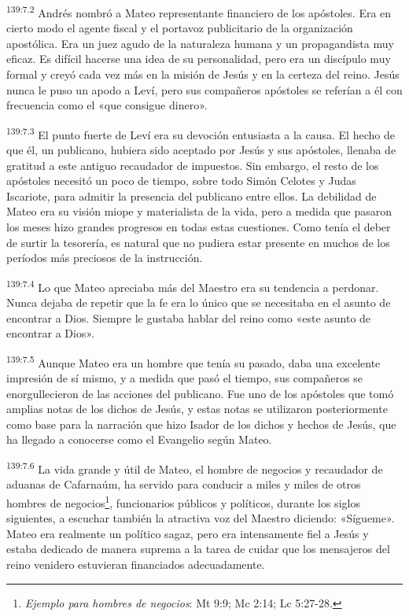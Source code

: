 \par
\textsuperscript{139:7.2} Andrés nombró a Mateo representante financiero de los apóstoles. Era en cierto modo el agente fiscal y el portavoz publicitario de la organización apostólica. Era un juez agudo de la naturaleza humana y un propagandista muy eficaz. Es difícil hacerse una idea de su personalidad, pero era un discípulo muy formal y creyó cada vez más en la misión de Jesús y en la certeza del reino. Jesús nunca le puso un apodo a Leví, pero sus compañeros apóstoles se referían a él con frecuencia como el «que consigue dinero».

\par
\textsuperscript{139:7.3} El punto fuerte de Leví era su devoción entusiasta a la causa. El hecho de que él, un publicano, hubiera sido aceptado por Jesús y sus apóstoles, llenaba de gratitud a este antiguo recaudador de impuestos. Sin embargo, el resto de los apóstoles necesitó un poco de tiempo, sobre todo Simón Celotes y Judas Iscariote, para admitir la presencia del publicano entre ellos. La debilidad de Mateo era su visión miope y materialista de la vida, pero a medida que pasaron los meses hizo grandes progresos en todas estas cuestiones. Como tenía el deber de surtir la tesorería, es natural que no pudiera estar presente en muchos de los períodos más preciosos de la instrucción.

\par
\textsuperscript{139:7.4} Lo que Mateo apreciaba más del Maestro era su tendencia a perdonar. Nunca dejaba de repetir que la fe era lo único que se necesitaba en el asunto de encontrar a Dios. Siempre le gustaba hablar del reino como «este asunto de encontrar a Dios».

\par
\textsuperscript{139:7.5} Aunque Mateo era un hombre que tenía su pasado, daba una excelente impresión de sí mismo, y a medida que pasó el tiempo, sus compañeros se enorgullecieron de las acciones del publicano. Fue uno de los apóstoles que tomó amplias notas de los dichos de Jesús, y estas notas se utilizaron posteriormente como base para la narración que hizo Isador de los dichos y hechos de Jesús, que ha llegado a conocerse como el Evangelio según Mateo.

\par
\textsuperscript{139:7.6} La vida grande y útil de Mateo, el hombre de negocios y recaudador de aduanas de Cafarnaúm, ha servido para conducir a miles y miles de otros hombres de negocios\footnote{\textit{Ejemplo para hombres de negocios}: Mt 9:9; Mc 2:14; Lc 5:27-28.}, funcionarios públicos y políticos, durante los siglos siguientes, a escuchar también la atractiva voz del Maestro diciendo: «Sígueme». Mateo era realmente un político sagaz, pero era intensamente fiel a Jesús y estaba dedicado de manera suprema a la tarea de cuidar que los mensajeros del reino venidero estuvieran financiados adecuadamente.

